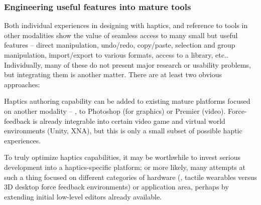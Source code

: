 %
%


%
%
\subsubsection{Engineering useful features into mature tools} 
Both individual experiences in designing with haptics, and reference to tools in other modalities show the value of seamless access to many small but useful features --
direct manipulation, undo/redo, copy/paste, selection and group manipulation, import/export to various formats, access to a library, etc..
%
Individually, many of these do not present major research or usability problems, but integrating them is another matter. There are at least two obvious approaches:

    Haptics authoring capability can be added to existing mature platforms focused on another modality -- \eg, to Photoshop (for graphics)  or Premier (video).
    Force-feedback is already integrable into certain video game and virtual world environments (Unity, XNA), but this is only a small subset of possible haptic experiences.

    To truly optimize haptics capabilities, it may be worthwhile to invest serious development into a haptics-specific platform; or more likely, many attempts at such a thing focused on different categories of hardware (\eg, tactile wearables versus 3D desktop force feedback environments) or application area, perhaps by extending initial low-level editors already available.

